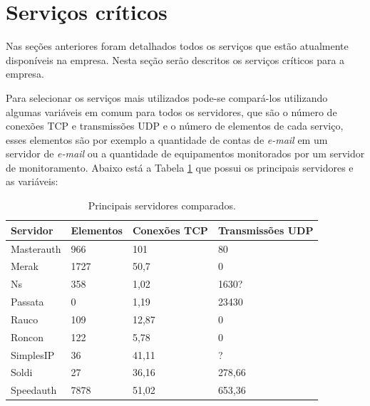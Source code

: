 \section{Serviços críticos}
\label{section:servcrit}

Nas seções anteriores foram detalhados todos os serviços que estão atualmente disponíveis na empresa. Nesta seção serão descritos os serviços 
críticos para a empresa. 

Para selecionar os serviços mais utilizados pode-se compará-los utilizando algumas variáveis em comum para todos os servidores, que são o número 
de conexões \ac{TCP} e transmissões \ac{UDP} e o número de elementos de cada serviço, esses elementos são por exemplo a quantidade de 
contas de \textit{e-mail} em um servidor de \textit{e-mail} ou a quantidade de equipamentos monitorados por um servidor de monitoramento. 
Abaixo está a Tabela \ref{tab:servicoscompara} que possui os principais servidores e as variáveis:

\begin{table}[h!]
\caption{Principais servidores comparados.}
\label{tab:servicoscompara}
\begin{center}
\begin{tabular}{|p{2cm}|l|l|l|}\hline
Servidor & Elementos & Conexões TCP & Transmissões UDP\\\hline
Masterauth & 966 & 101 & 80\\\hline
Merak & 1727 & 50,7 & 0\\\hline
Ns & 358 & 1,02 & 1630?\\\hline
Passata & 0 & 1,19 & 23430\\\hline
Rauco & 109 & 12,87 & 0\\\hline
Roncon & 122 & 5,78 & 0\\\hline
SimplesIP & 36 & 41,11 & ?\\\hline
Soldi & 27 & 36,16 & 278,66\\\hline
Speedauth & 7878 & 51,02 & 653,36\\\hline
\end{tabular}
\end{center}
\end{table}

